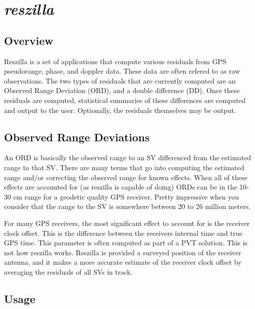 %
%

\section{\emph{reszilla}}
\subsection{Overview}
Reszilla is a set of applications that compute various residuals from GPS
pseudorange, phase, and doppler data. These data are often refered to
as raw observations. The two types of residuals that are currently
computed are an Observed Range Deviation (ORD), and a double
difference (DD). Once these residuals are computed, statistical
summaries of these differences are computed and output to the
user. Optionally, the residuals themselves may be output.

\subsection{Observed Range Deviations}
An ORD is basically the observed range to an SV differenced from the
estimated range to that SV. There are many terms that go into
computing the estimated range and/or correcting the observed range for
known effects. When all of these effects are accounted for (as
reszilla is capable of doing) ORDs can be in the 10-30 cm range for a
geodetic quality GPS receiver. Pretty impressive when you consider
that the range to the SV is somewhere between 20 to 26 million meters.

For many GPS receivers, the most significant effect to account for is the receiver
clock offset. This is the difference between the receivers internal time and true
GPS time. This parameter is often computed as part of a PVT solution. This is not
how reszilla works. Reszilla is provided a surveyed position of the receiver
antenna, and it makes a more accurate estimate of the receiver clock offset by
averaging the residuals of all SVs in track.

\subsection{Usage}


